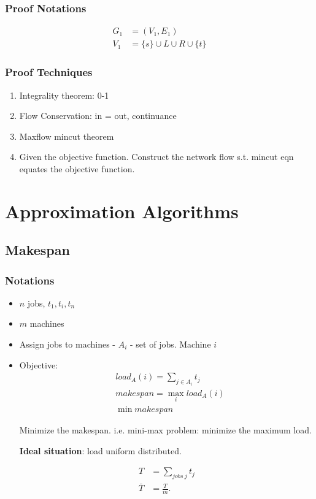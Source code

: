 \documentclass[a4paper]{report}
\theoremstyle{definition}
\begin{document}
\subsection{Proof Notations}
\begin{align*}
G_1 &= (V_1, E_1) \\  
V_1 &= \{s\} \cup L \cup R \cup \{t\}
\end{align*}

\subsection{Proof Techniques}
\begin{enumerate}
\item Integrality theorem: 0-1
\item Flow Conservation: in = out, continuance
\item Maxflow mincut theorem 
\item Given the objective function. Construct the network flow s.t. mincut eqn equates the objective function. 
\end{enumerate}

\chapter{Approximation Algorithms}
\section{Makespan}
\subsection{Notations}
\begin{itemize}
\item $n$ jobs, $t_1, t_i, t_n$
\item $m$ machines
\item Assign jobs to machines - $A_i$ - set of jobs. Machine $i$
\item Objective:
\begin{align*}
&load_A(i)=\sum_{j\in A_i} t_j\\
&makespan = \max_i load_A(i)\\
&\min makespan
\end{align*}

Minimize the makespan. i.e. mini-max problem: minimize the maximum load.

\textbf{Ideal situation}: load uniform distributed.

\begin{align*}
T&=\sum_{jobs~j}t_j\\
\bar T &= \frac{T}{m}.
\end{align*}
\end{itemize}
\end{document}
